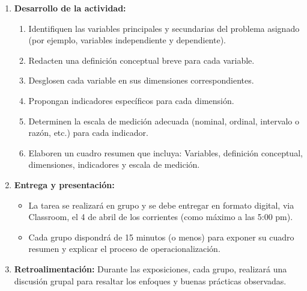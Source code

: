 \documentclass[12pt]{article}
\begin{document}
\begin{enumerate}
    
 \item \textbf{Desarrollo de la actividad:}
    \begin{enumerate}
        \item Identifiquen las variables principales y secundarias del problema asignado (por ejemplo, variables independiente y dependiente). 
        \item Redacten una definición conceptual breve para cada variable.
        \item Desglosen cada variable en sus dimensiones correspondientes.
        \item Propongan indicadores específicos para cada dimensión.
        \item Determinen la escala de medición adecuada (nominal, ordinal, intervalo o razón, etc.) para cada indicador.
        \item Elaboren un cuadro resumen que incluya: Variables, definición conceptual, dimensiones, indicadores y escala de medición.
    \end{enumerate}
    
    \item \textbf{Entrega y presentación:}
    \begin{itemize}
        \item La tarea se realizará en grupo y se debe entregar en formato digital, via Classroom, el 4 de abril de los corrientes (como máximo a las 5:00 pm).
        \item Cada grupo dispondrá de 15 minutos (o menos) para exponer su cuadro resumen y explicar el proceso de operacionalización.
    \end{itemize}
    
    \item \textbf{Retroalimentación:} Durante las exposiciones, cada grupo, realizará una discusión grupal para resaltar los enfoques y buenas prácticas observadas.
\end{enumerate}
\end{document}
